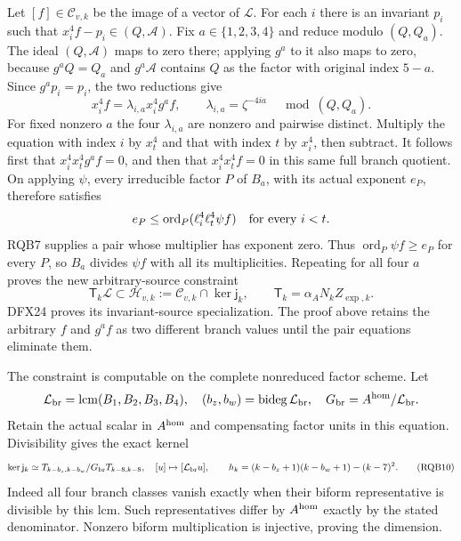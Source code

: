 \documentclass[11pt,a4paper]{article}
\begin{document}
Let $[f]\in\mathscr C_{v,k}$ be the image of a vector of $\mathscr L$.
For each $i$ there is an invariant $p_i$ such that
$x_i^4f-p_i\in(Q,\mathcal A)$.
Fix $a\in\{1,2,3,4\}$ and reduce modulo $(Q,Q_a)$.
The ideal $(Q,\mathcal A)$ maps to zero there; applying $g^a$
to it also maps to zero, because $g^aQ=Q_a$ and $g^a\mathcal A$
contains $Q$ as the factor with original index $5-a$.
Since $g^ap_i=p_i$, the two reductions give
\[
 x_i^4f=\lambda_{i,a}x_i^4g^af,\qquad
 \lambda_{i,a}=\zeta^{-4ia}\quad\bmod(Q,Q_a).
 \tag{RQB8}
\]
For fixed nonzero $a$ the four $\lambda_{i,a}$ are nonzero and
pairwise distinct. Multiply the equation with index $i$ by
$x_t^4$ and that with index $t$ by $x_i^4$, then subtract.
It follows first that $x_i^4x_t^4g^af=0$, and then that
$x_i^4x_t^4f=0$ in this same full branch quotient.
On applying $\psi$, every irreducible factor $P$ of $B_a$,
with its actual exponent $e_P$, therefore satisfies
\[
 e_P\le\operatorname{ord}_P(\ell_i^4\ell_t^4\psi f)
                  \quad\hbox{for every }i<t .
\]
RQB7 supplies a pair whose multiplier has exponent zero.
Thus $\operatorname{ord}_P\psi f\ge e_P$ for every $P$,
so $B_a$ divides $\psi f$ with all its multiplicities.
Repeating for all four $a$ proves the new arbitrary-source constraint
\[
 \mathsf T_k\mathscr L\subset
 \mathscr H_{v,k}:=\mathscr C_{v,k}\cap\ker\mathsf j_k,\qquad
 \mathsf T_k=\alpha_A N_kZ_{\exp,k}.
 \tag{RQB9}
\]
DFX24 proves its invariant-source specialization. The proof above
retains the arbitrary $f$ and $g^af$ as two different branch values
until the pair equations eliminate them.

The constraint is computable on the complete nonreduced factor scheme.
Let
\[
 \mathcal L_{\rm br}=\operatorname{lcm}(B_1,B_2,B_3,B_4),
 \quad (b_z,b_w)=\operatorname{bideg}\mathcal L_{\rm br},\quad
 G_{\rm br}=A^{\rm hom}/\mathcal L_{\rm br}.
\]
Retain the actual scalar in $A^{\rm hom}$ and compensating factor
units in this equation. Divisibility gives the exact kernel
\[
 \ker\mathsf j_k\simeq
 T_{k-b_z,k-b_w}/G_{\rm br}T_{k-8,k-8},
 \quad [u]\mapsto[\mathcal L_{\rm br}u],\qquad
 h_k=(k-b_z+1)(k-b_w+1)-(k-7)^2 .
 \tag{RQB10}
\]
Indeed all four branch classes vanish exactly when their biform
representative is divisible by this lcm. Such representatives
differ by $A^{\rm hom}$ exactly by the stated denominator.
Nonzero biform multiplication is injective, proving the dimension.
\end{document}
